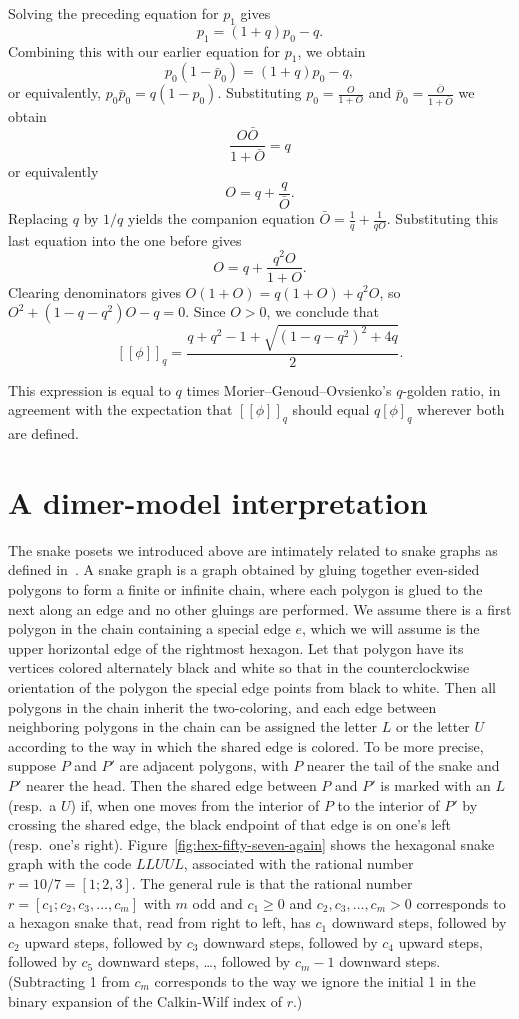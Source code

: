 \documentclass[12pt]{article}
\theoremstyle{plain}
\theoremstyle{definition}
\theoremstyle{remark}
\newcommand{\llb}{[\![}
\newcommand{\rrb}{]\!]}
\begin{document}
Solving the preceding equation for $p_1$ gives
\[ p_1=(1+q)p_0-q.  \]
Combining this with our earlier equation for $p_1$, we obtain
\[ p_0(1-\bar p_0)=(1+q)p_0-q, \]
or equivalently, $p_0 \bar p_0 = q(1-p_0)$.
Substituting $p_0=\frac{O}{1+O}$ and $\bar p_0 = \frac{\bar O}{1+\bar O}$
we obtain $$\frac{O\bar O}{1+\bar O}=q$$ or equivalently $$O=q+\frac{q}{\bar O}.$$
Replacing $q$ by $1/q$ yields the companion equation
$\bar O=\frac1q+\frac{1}{qO}$.
Substituting this last equation into the one before gives
\[ O = q+\frac{q^2O}{1+O}.  \]
Clearing denominators gives $O(1+O)=q(1+O)+q^2O$,
so $O^2+(1-q-q^2)O-q=0$.
Since $O>0$, we conclude that
\[ \llb\phi\rrb_q = \frac{q+q^2-1+\sqrt{(1-q-q^2)^2+4q}}{2}.  \]

This expression is equal to $q$ times Morier--Genoud--Ovsienko's $q$-golden ratio,
in agreement with the expectation that $\llb\phi\rrb_q$
should equal $q[\phi]_q$ wherever both are defined.

\section{A dimer-model interpretation}
\label{sec:dimer}

The snake posets we introduced above are intimately related
to snake graphs as defined in~\cite{P01}.
A snake graph is a graph obtained by gluing together even-sided polygons 
to form a finite or infinite chain,
where each polygon is glued to the next along an edge
and no other gluings are performed.
We assume there is a first polygon in the chain containing 
a special edge $e$, which we will assume is
the upper horizontal edge of the rightmost hexagon.
Let that polygon have its vertices colored alternately black and white
so that in the counterclockwise orientation of the polygon
the special edge points from black to white.
Then all polygons in the chain inherit the two-coloring,
and each edge between neighboring polygons in the chain
can be assigned the letter $L$ or the letter $U$
according to the way in which the shared edge is colored.
To be more precise, suppose $P$ and $P'$ are adjacent polygons,
with $P$ nearer the tail of the snake and $P'$ nearer the head.
Then the shared edge between $P$ and $P'$
is marked with an $L$ (resp.\ a $U$) if, 
when one moves from the interior of $P$
to the interior of $P'$ by crossing the shared edge,
the black endpoint of that edge
is on one's left (resp.\ one's right).
Figure~\ref{fig:hex-fifty-seven-again}
shows the hexagonal snake graph with the code $LLUUL$,
associated with the rational number $r=10/7=[1;2,3]$.
The general rule is that the rational number $r = [c_1;c_2,c_3,\dots,c_m]$
with $m$ odd and $c_1 \geq 0$ and $c_2,c_3,\dots,c_m > 0$
corresponds to a hexagon snake that, read from right to left, 
has $c_1$ downward steps, followed by $c_2$ upward steps,
followed by $c_3$ downward steps, followed by $c_4$ upward steps,
followed by $c_5$ downward steps, \dots, followed by $c_m-1$ downward steps.
(Subtracting 1 from $c_m$ corresponds to the way we ignore the initial 1
in the binary expansion of the Calkin-Wilf index of $r$.)
\end{document}
